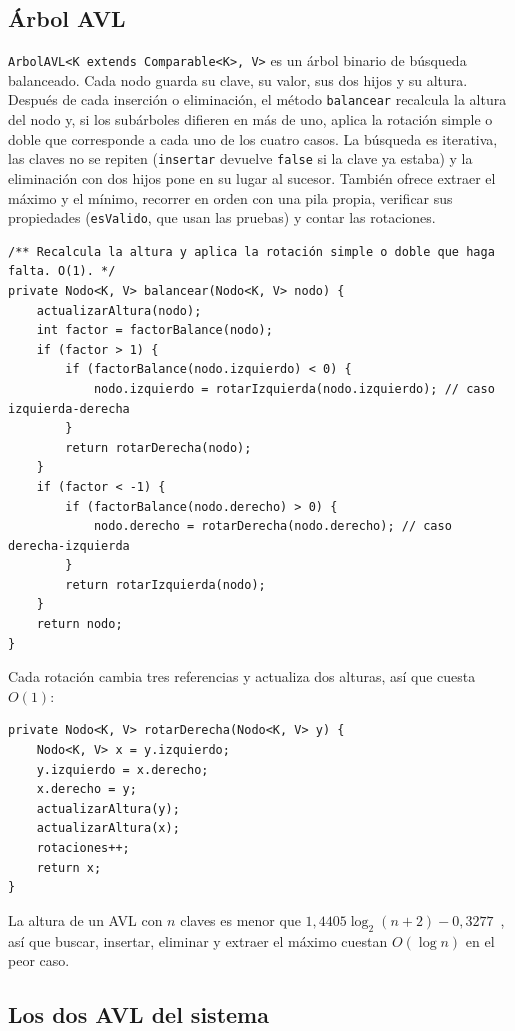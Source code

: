 \documentclass[11pt,letterpaper]{article}
\begin{document}
\subsection{Árbol AVL}
\texttt{ArbolAVL<K extends Comparable<K>, V>} es un árbol binario de búsqueda balanceado. Cada nodo guarda su clave, su valor, sus dos hijos y su altura. Después de cada inserción o eliminación, el método \texttt{balancear} recalcula la altura del nodo y, si los subárboles difieren en más de uno, aplica la rotación simple o doble que corresponde a cada uno de los cuatro casos. La búsqueda es iterativa, las claves no se repiten (\texttt{insertar} devuelve \texttt{false} si la clave ya estaba) y la eliminación con dos hijos pone en su lugar al sucesor. También ofrece extraer el máximo y el mínimo, recorrer en orden con una pila propia, verificar sus propiedades (\texttt{esValido}, que usan las pruebas) y contar las rotaciones.
\begin{lstlisting}[style=java]
/** Recalcula la altura y aplica la rotación simple o doble que haga falta. O(1). */
private Nodo<K, V> balancear(Nodo<K, V> nodo) {
    actualizarAltura(nodo);
    int factor = factorBalance(nodo);
    if (factor > 1) {
        if (factorBalance(nodo.izquierdo) < 0) {
            nodo.izquierdo = rotarIzquierda(nodo.izquierdo); // caso izquierda-derecha
        }
        return rotarDerecha(nodo);
    }
    if (factor < -1) {
        if (factorBalance(nodo.derecho) > 0) {
            nodo.derecho = rotarDerecha(nodo.derecho); // caso derecha-izquierda
        }
        return rotarIzquierda(nodo);
    }
    return nodo;
}
\end{lstlisting}

Cada rotación cambia tres referencias y actualiza dos alturas, así que cuesta $O(1)$:
\begin{lstlisting}[style=java]
private Nodo<K, V> rotarDerecha(Nodo<K, V> y) {
    Nodo<K, V> x = y.izquierdo;
    y.izquierdo = x.derecho;
    x.derecho = y;
    actualizarAltura(y);
    actualizarAltura(x);
    rotaciones++;
    return x;
}
\end{lstlisting}

La altura de un AVL con $n$ claves es menor que $1{,}4405 \log_2(n + 2) - 0{,}3277$~\cite{knuth1998,avl1962}, así que buscar, insertar, eliminar y extraer el máximo cuestan $O(\log n)$ en el peor caso.

\subsection{Los dos AVL del sistema}
\end{document}
